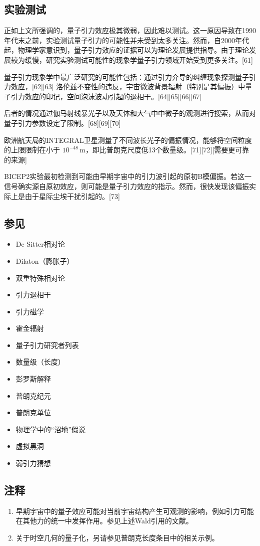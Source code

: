 \subsection{实验测试}
正如上文所强调的，量子引力效应极其微弱，因此难以测试。这一原因导致在1990年代末之前，实验测试量子引力的可能性并未受到太多关注。然而，自2000年代起，物理学家意识到，量子引力效应的证据可以为理论发展提供指导。由于理论发展较为缓慢，研究实验测试可能性的现象学量子引力领域开始受到更多关注。[61]  

量子引力现象学中最广泛研究的可能性包括：通过引力介导的纠缠现象探测量子引力效应，[62][63]  洛伦兹不变性的违反，宇宙微波背景辐射（特别是其偏振）中量子引力效应的印记，空间泡沫波动引起的退相干。[64][65][66][67]  

后者的情况通过伽马射线暴光子以及天体和大气中中微子的观测进行搜索，从而对量子引力参数设定了限制。[68][69][70]  

欧洲航天局的INTEGRAL卫星测量了不同波长光子的偏振情况，能够将空间粒度的上限限制在小于 \(10^{-48} \, \text{m}\)，即比普朗克尺度低13个数量级。[71][72][需要更可靠的来源]  

BICEP2实验最初检测到可能由早期宇宙中的引力波引起的原初B模偏振。若这一信号确实源自原初效应，则可能是量子引力效应的指示。然而，很快发现该偏振实际上是由于星际尘埃干扰引起的。[73]  
\subsection{参见}
\begin{itemize}
\item De Sitter相对论 
\item Dilaton（膨胀子）  
\item 双重特殊相对论  
\item 引力退相干  
\item 引力磁学  
\item 霍金辐射  
\item 量子引力研究者列表  
\item 数量级（长度）  
\item 彭罗斯解释  
\item 普朗克纪元  
\item 普朗克单位  
\item 物理学中的“沼地”假说  
\item 虚拟黑洞  
\item 弱引力猜想
\end{itemize}
\subsection{注释}  
\begin{enumerate}
\item 早期宇宙中的量子效应可能对当前宇宙结构产生可观测的影响，例如引力可能在其他力的统一中发挥作用。参见上述Wald引用的文献。  
\item 关于时空几何的量子化，另请参见普朗克长度条目中的相关示例。
\end{enumerate}